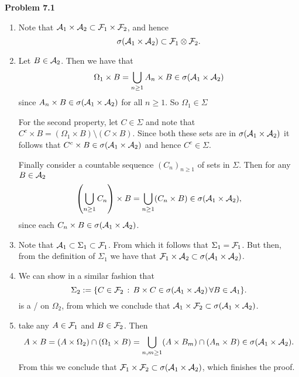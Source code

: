    
\textbf{Problem 7.1}
\begin{enumerate}[label={(\alph*)}]
\item Note that $\mathcal A_1 \times \mathcal A_2 \subset \mathcal F_1 \times \mathcal F_2$, and hence
\[
	\sigma(\mathcal A_1 \times \mathcal A_2) \subset \mathcal F_1 \otimes \mathcal F_2.
\]
\item Let $B \in \mathcal A_2$. Then we have that
\[
	\Omega_1 \times B = \bigcup_{n \ge 1} A_n \times B \in \sigma(\mathcal A_1 \times \mathcal A_2) 
\]
since $A_n \times B \in \sigma(\mathcal A_1 \times \mathcal A_2)$ for all $n \ge 1$. So $\Omega_1 \in \Sigma$

For the second property, let $C \in \Sigma$ and note that $C^c \times B = (\Omega_1 \times B) \setminus (C \times B)$.
Since both these sets are in $\sigma(\mathcal A_1 \times \mathcal A_2)$ it follows that $C^c \times B \in \sigma(\mathcal A_1 \times \mathcal A_2)$ and hence $C^c \in \Sigma$.

Finally consider a countable sequence $(C_n)_{n \ge 1}$ of sets in $\Sigma$. Then for any $B \in \mathcal A_2$
\[
	\left(\bigcup_{n \ge 1} C_n \right) \times B = \bigcup_{n \ge 1} (C_n \times B) \in \sigma(\mathcal A_1 \times \mathcal A_2),
\]
since each $C_n \times B \in \sigma(\mathcal A_1 \times \mathcal A_2)$.
\item Note that $\mathcal A_1 \subset \Sigma_1 \subset \mathcal F_1$. From which it follows that $\Sigma_1 = \mathcal F_1$. But then, from the definition of $\Sigma_1$ we have that $\mathcal F_1 \times \mathcal A_2 \subset \sigma(\mathcal A_1 \times \mathcal A_2)$.
\item We can show in a similar fashion that
\[
	\Sigma_2 := \{C \in \mathcal F_2 \, : \, B \times C \in \sigma(\mathcal A_1 \times \mathcal A_2) \, \forall B \in \mathcal A_1\}.
\]
is a \sigalg/ on $\Omega_2$, from which we conclude that $\mathcal A_1 \times \mathcal F_2 \subset \sigma(\mathcal A_1 \times \mathcal A_2)$.
\item take any $A \in \mathcal F_1$ and $B \in \mathcal F_2$. Then
\[
	A \times B = (A \times \Omega_2) \cap (\Omega_1 \times B) = \bigcup_{n,m \ge 1} (A \times B_m) \cap (A_n \times B) \in \sigma(\mathcal A_1 \times \mathcal A_2).
\]
From this we conclude that $\mathcal F_1 \times \mathcal F_2 \subset \sigma(\mathcal A_1 \times \mathcal A_2)$, which finishes the proof.
\end{enumerate}
